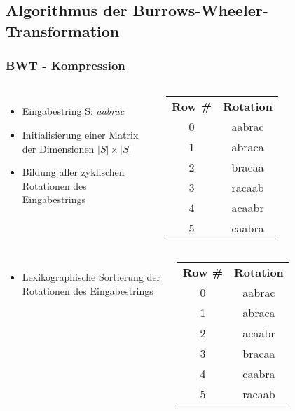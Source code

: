 \documentclass[14pt,xcolor=dvipsnames]{beamer}
\begin{document}
\subsection{Algorithmus der Burrows-Wheeler-Transformation}
\begin{frame}[allowframebreaks]
 \frametitle{BWT - Kompression}
    \begin{columns}[c,onlytextwidth]
    \begin{itemize}
	\item Eingabestring S: \textit{aabrac}
	\item Initialisierung einer Matrix der Dimensionen $|S| \times |S|$
	\item Bildung aller zyklischen Rotationen des Eingabestrings
    \end{itemize}
    \begin{tabular}{c|c}
    \textbf{Row \#} & \textbf{Rotation} \\
    0 & aabrac \\
    1 & abraca \\
    2 & bracaa \\
    3 & racaab \\
    4 & acaabr \\
    5 & caabra \\
    \end{tabular}
    \end{columns}
\framebreak
\begin{columns}[c,onlytextwidth]
 \begin{itemize}
  \item Lexikographische Sortierung der Rotationen des Eingabestrings
 \end{itemize}
    \begin{tabular}{c|c}
    \textbf{Row \#} & \textbf{Rotation} \\
    0 & aabrac \\
    1 & abraca \\
    2 & acaabr \\
    3 & bracaa \\
    4 & caabra \\
    5 & racaab \\
    \end{tabular}
\end{columns}
\framebreak
\begin{columns}[c,onlytextwidth]

\end{columns}
\end{frame}
\end{document}
